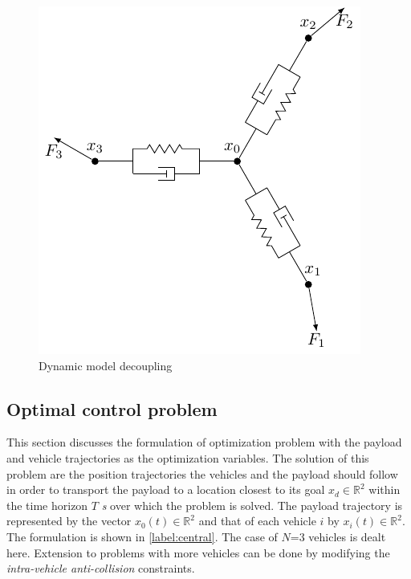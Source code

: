 \documentclass[letterpaper, 10 pt, conference]{ieeeconf}
\begin{document}
\begin{figure}
  \centering
  \includegraphics[scale=1]{figures/schematic.pdf}
  \caption{Dynamic model decoupling}
  \label{2D_schematic}
\end{figure}

\subsection{Optimal control problem}
This section discusses the formulation of optimization problem with the payload and vehicle trajectories as the optimization variables. The solution of this problem are the position trajectories the vehicles and the payload should follow in order to transport the payload to a location closest to its goal $x_d \in \mathbb{R}^2$ within the time horizon $T$ \textit{s} over which the problem is solved.
The payload trajectory is represented by the vector ${x_0(t) \in \mathbb{R}^2}$ and that of each vehicle $i$ by ${x_i(t) \in \mathbb{R}^2}$.
 The formulation is shown in \eqref{label:central}. The case of $N$=3 vehicles is dealt here. Extension to problems with more vehicles can be done by modifying the \textit{intra-vehicle anti-collision} constraints.
\end{document}
